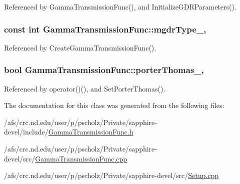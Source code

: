 Referenced by Gamma\-Transmission\-Func(), and Initialize\-G\-D\-R\-Parameters().

\hypertarget{classGammaTransmissionFunc_ae885f247bb9f13b1ff11aca3626e4069}{
\subsubsection[{mgdr\-Type\-\_\-}]{\setlength{\rightskip}{0pt plus 5cm}const int Gamma\-Transmission\-Func\-::mgdr\-Type\-\_\hspace{0.3cm}{\ttfamily [static]}, {\ttfamily [protected]}}}\label{classGammaTransmissionFunc_ae885f247bb9f13b1ff11aca3626e4069}


Referenced by Create\-Gamma\-Transmission\-Func().

\hypertarget{classGammaTransmissionFunc_a60dd0efc70eea322e8ca51432418cca2}{
\subsubsection[{porter\-Thomas\-\_\-}]{\setlength{\rightskip}{0pt plus 5cm}bool Gamma\-Transmission\-Func\-::porter\-Thomas\-\_\-\hspace{0.3cm}{\ttfamily [static]}, {\ttfamily [protected]}}}\label{classGammaTransmissionFunc_a60dd0efc70eea322e8ca51432418cca2}


Referenced by operator()(), and Set\-Porter\-Thomas().



The documentation for this class was generated from the following files\-:\begin{DoxyCompactItemize}
\item 
/afs/crc.\-nd.\-edu/user/p/pscholz/\-Private/sapphire-\/devel/include/\hyperlink{GammaTransmissionFunc_8h}{Gamma\-Transmission\-Func.\-h}\item 
/afs/crc.\-nd.\-edu/user/p/pscholz/\-Private/sapphire-\/devel/src/\hyperlink{GammaTransmissionFunc_8cpp}{Gamma\-Transmission\-Func.\-cpp}\item 
/afs/crc.\-nd.\-edu/user/p/pscholz/\-Private/sapphire-\/devel/src/\hyperlink{Setup_8cpp}{Setup.\-cpp}\end{DoxyCompactItemize}
